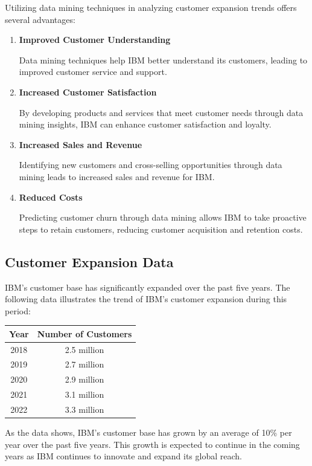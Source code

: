 Utilizing data mining techniques in analyzing customer expansion trends offers several advantages:
\begin{enumerate}
\item \textbf{Improved Customer Understanding}

Data mining techniques help IBM better understand its customers, leading to improved customer service and support.

\item \textbf{Increased Customer Satisfaction}

By developing products and services that meet customer needs through data mining insights, IBM can enhance customer satisfaction and loyalty.

\item \textbf{Increased Sales and Revenue}

Identifying new customers and cross-selling opportunities through data mining leads to increased sales and revenue for IBM.

\item \textbf{Reduced Costs}

Predicting customer churn through data mining allows IBM to take proactive steps to retain customers, reducing customer acquisition and retention costs.
\end{enumerate}

\subsection{Customer Expansion Data}

IBM's customer base has significantly expanded over the past five years. The following data illustrates the trend of IBM's customer expansion during this period:

\begin{table}[h]
\centering
\begin{tabular}{|c|c|}
\hline
\textbf{Year} & \textbf{Number of Customers} \\
\hline
2018 & 2.5 million \\
2019 & 2.7 million \\
2020 & 2.9 million \\
2021 & 3.1 million \\
2022 & 3.3 million \\
\hline
\end{tabular}
\end{table}

As the data shows, IBM's customer base has grown by an average of 10\% per year over the past five years. This growth is expected to continue in the coming years as IBM continues to innovate and expand its global reach.

